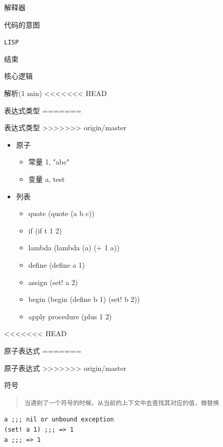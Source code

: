 \documentclass[presentation, bigger]{beamer}
\begin{document}
\begin{frame}[label={sec:org106539d},fragile]{解释器}
\begin{frame}[label={sec:org3020c49},fragile]{代码的意图}
\begin{frame}[label={sec:org3aa0441},fragile]{\texttt{LISP}}
\begin{frame}[label={sec:orgae54002}]{结束}
\begin{frame}[label={sec:orgdceac76}]{核心逻辑}
\begin{frame}[label={sec:org629dbc5},fragile]{解析(1 min)}
<<<<<<< HEAD
\begin{frame}[label={sec:org4dc3947}]{表达式类型}
=======
\begin{frame}[label={sec:org8cf6684}]{表达式类型}
>>>>>>> origin/master
\begin{itemize}
\item 原子
\begin{itemize}
\item 常量 \alert{1}, \alert{"abc"}
\item 变量 \alert{a}, \alert{test}
\end{itemize}
\item 列表
\begin{itemize}
\item quote \alert{(quote (a b c))}
\item if \alert{(if t 1 2)}
\item lambda \alert{(lambda (a) (+ 1 a))}
\item define \alert{(define a 1)}
\item assign \alert{(set! a 2)}
\item begin \alert{(begin (define b 1) (set! b 2))}
\item apply procedure \alert{(plus 1 2)}
\end{itemize}
\end{itemize}
\end{frame}

<<<<<<< HEAD
\begin{frame}[label={sec:org0820679},fragile]{原子表达式}
=======
\begin{frame}[fragile,label={sec:orga68c5b0}]{原子表达式}
>>>>>>> origin/master
 \begin{block}{符号}
\begin{quote}
\texttt{当遇到了一个符号的时候，从当前的上下文中去查找其对应的值，做替换}
\end{quote}

\begin{lstlisting}
a ;;; nil or unbound exception
(set! a 1) ;;; => 1
a ;;; => 1
\end{lstlisting}
\end{block}


\end{frame}
\end{frame}
\end{frame}
\end{frame}
\end{frame}
\end{frame}
\end{frame}
\end{frame}
\end{frame}
\end{document}
